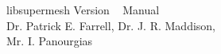\documentclass[a4paper]{book}
\begin{document}
\begin{titlepage}
\begin{center}

\Huge{libsupermesh Version \version~ Manual} \\[0.15\textheight]
\Large{Dr. Patrick E. Farrell, Dr. J. R. Maddison, \\ Mr. I. Panourgias}

\end{center}
\end{titlepage}

\tableofcontents

%
%
\end{document}
